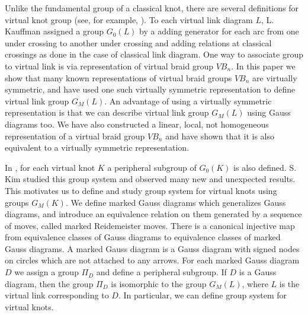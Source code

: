 \documentclass[11 pt, reqno]{amsart}
\theoremstyle{definition}
\numberwithin{equation}{subsection}
\begin{document}
Unlike the fundamental group of a classical knot, there are several definitions for virtual knot group (see, for example, \cite{Bar-1,BB-1, BB-2, BMN-1, BMN-2, BN-2, BN-3, BDGGHN-1, CSW-1, Kauffman-1, Man, SW-1}). To each virtual link diagram $L$, L. Kauffman \cite{Kauffman-1} assigned a group $G_0(L)$ by a adding generator for each arc from one under crossing to another under crossing and adding relations at classical crossings as done in the case of classical link diagram. One way to associate group to virtual link is via representation of virtual braid group $VB_n$. In this paper we show that many known representations of virtual braid groups $VB_n$ are virtually symmetric, and  have used one such virtually symmetric representation to define virtual link group $G_M(L)$. An advantage of using a virtually symmetric representation is that we can describe virtual link group $G_M(L)$ using Gauss diagrams too. We have also constructed a linear, local, not homogeneous representation of a virtual braid group $VB_n$ and have shown that it is also equivalent to a virtually symmetric representation. 
\par 

In \cite{Kauffman-1}, for each virtual knot $K$ a peripheral subgroup of $G_0(K)$ is also defined. S. Kim \cite{Kim-1} studied this group system and observed many new and unexpected results. This motivates us to define and study group system for virtual knots using groups $G_M(K)$. We define marked Gauss diagrams which generalizes Gauss diagrams, and introduce an equivalence relation on them generated by a sequence of moves, called marked Reidemeister moves. There is a canonical injective map from equivalence classes of Gauss diagrams to equivalence classes of marked Gauss diagrams. A marked Gauss diagram is a Gauss diagram with signed nodes on circles which are not attached to any arrows. For each marked Gauss diagram $D$ we assign a group $\Pi_D$ and define a peripheral subgroup. If $D$ is a Gauss diagram, then the group $\Pi_D$ is isomorphic to the group $G_M(L)$, where $L$ is the virtual link corresponding to $D$. In particular, we can define group system for virtual knots.
\par 
\end{document}
